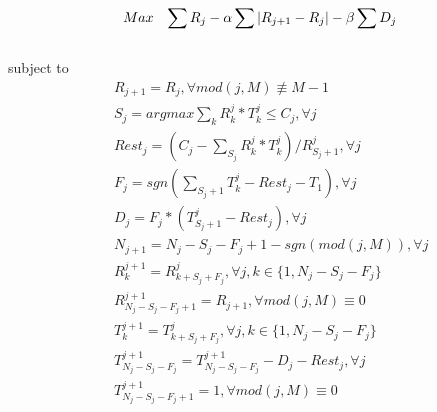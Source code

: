 \begin{eqnarray}
&Max& \sum R_j- \alpha\sum|R_{j+1}-R_j|-\beta\sum D_j
\label{vbr-formulation} \mylabel{vbr-formulation}
\end{eqnarray}
\\ subject to
\begin{eqnarray}
&& R_{j+1}=R_j, \forall mod(j,M)\not\equiv M-1 \label{vbr-bitrate}\\
&& S_j = argmax{\sum_k R_k^j*T_k^j \leq C_j}, \forall j \label{vbr-send} \\
&& Rest_j = (C_j- \sum_{S_j} R_k^j*T_k^j)/R_{S_j+1}^j, \forall j \\
&& F_j = sgn(\sum_{S_j+1} T_k^j - Rest_j-T_1), \forall j \label{vbr-drop}\\
&& D_j = F_j*(T_{S_j+1}^j-Rest_j), \forall j \label{vbr-drop-no} \\
&& N_{j+1}=N_j-S_j-F_j+1-sgn(mod(j,M)), \forall j \label{vbr-gop-no}\\
&& R_k^{j+1}=R_{k+S_j+F_j}^j, \forall j, k\in \{1,N_j-S_j-F_j\} \label{vbr-bitrate-next}\\
&& R_{N_j-S_j-F_j+1}^{j+1} = R_{j+1}, \forall mod(j,M) \equiv 0 \label{vbr-bitrate-spec} \\
&& T_k^{j+1} = T_{k+S_j+F_j}^j, \forall j, k\in\{1, N_j-S_j-F_j\} \label{vbr-time-next} \\
&& T_{N_j-S_j-F_j}^{j+1} = T_{N_j-S_j-F_j}^{j+1} - D_j - Rest_j , \forall j \label{vbr-time-spec} \\
&& T_{N_j-S_j-F_j+1}^{j+1}=1, \forall mod(j,M)\equiv 0 \label{vbr-time-spec2} \\
\end{eqnarray}
